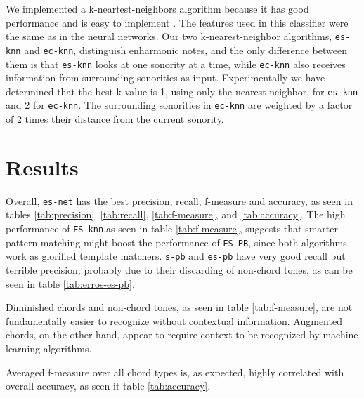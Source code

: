 \documentclass{article}
\begin{document}
We implemented a k-neartest-neighbors algorithm because it has good
performance and is easy to implement \cite{fix.ea89:important,
  gomez.ea04:estimating}. The features used in this classifier were the
same as in the neural networks. Our two k-nearest-neighbor algorithms,
\texttt{es-knn} and \texttt{ec-knn}, distinguish enharmonic notes, and
the only difference between them is that \texttt{es-knn} looks at one
sonority at a time, while \texttt{ec-knn} also receives information
from surrounding sonorities as input. Experimentally we have
determined that the best k value is 1, using only the nearest
neighbor, for \texttt{es-knn} and 2 for \texttt{ec-knn}. The
surrounding sonorities in \texttt{ec-knn} are weighted by a factor of
2 times their distance from the current sonority.

\section{Results}
\label{sec:discussion}


Overall, \texttt{es-net} has the best precision, recall, f-measure and
accuracy, as seen in tables \ref{tab:precision}, \ref{tab:recall},
\ref{tab:f-measure}, and \ref{tab:accuracy}. The high performance of
\texttt{ES-knn},as seen in table \ref{tab:f-measure}, suggests that
smarter pattern matching might boost the performance of \texttt{ES-PB}, since
both algorithms work as glorified template matchers. \texttt{s-pb} and
\texttt{es-pb} have very good recall but terrible precision, probably
due to their discarding of non-chord tones, as can be seen in table
\ref{tab:erros-es-pb}.


Diminished chords and
non-chord tones, as seen in table \ref{tab:f-measure}, are not
fundamentally easier to recognize without contextual
information. Augmented chords, on the other hand, appear to require
context to be recognized by machine learning algorithms.


Averaged f-measure over all chord types is, as expected, highly
correlated with overall accuracy, as seen it table \ref{tab:accuracy}.
\end{document}
